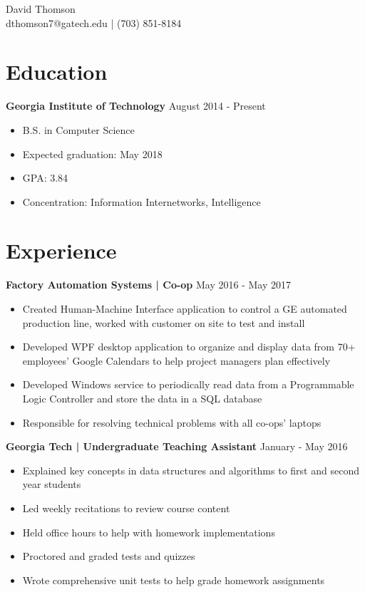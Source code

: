 \documentclass[10pt]{article}
\newcommand{\pipe}{| }
\begin{document}
\begin{center}
\vspace*{0.3em}
{\huge David Thomson} \\
\vspace*{1em}
dthomson7@gatech.edu \pipe (703) 851-8184
\end{center}

\section*{Education}
\textbf{Georgia Institute of Technology} \hfill August 2014 - Present
\begin{itemize}
    \item B.S. in Computer Science
    \item Expected graduation: May 2018
    \item GPA: 3.84
    \item Concentration: Information Internetworks, Intelligence
\end{itemize}

\section*{Experience}
\textbf{Factory Automation Systems \pipe Co-op} \hfill May 2016 - May 2017
\begin{itemize}
    \item Created Human-Machine Interface application to control a GE automated production line, worked with customer on site to test and install
    
    \item Developed WPF desktop application to organize and display data from 70+ employees' Google Calendars to help project managers plan effectively
    \item Developed Windows service to periodically read data from a Programmable Logic Controller and store the data in a SQL database
    \item Responsible for resolving technical problems with all co-ops' laptops
\end{itemize}

\vspace{3pt}

\textbf{Georgia Tech \pipe Undergraduate Teaching Assistant} \hfill January - May 2016
\begin{itemize}
    \item Explained key concepts in data structures and algorithms to first and second year students
    \item Led weekly recitations to review course content
    \item Held office hours to help with homework implementations
    \item Proctored and graded tests and quizzes
    \item Wrote comprehensive unit tests to help grade homework assignments
\end{itemize}
\end{document}

